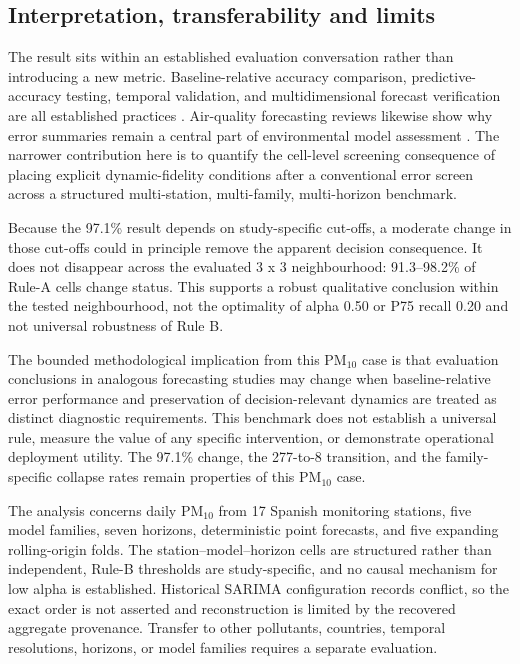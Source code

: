 \subsection{Interpretation, transferability and limits}

The result sits within an established evaluation conversation rather than
introducing a new metric. Baseline-relative accuracy comparison,
predictive-accuracy testing, temporal validation, and multidimensional
forecast verification are all established practices
\cite{hyndman2006,diebold1995,harvey1997,tashman2000,bergmeir2018,gneiting2011,jolliffe2012}.
Air-quality forecasting reviews likewise show why error summaries remain a
central part of environmental model assessment
\cite{mendez2023,tang2024,chadalavada2025}. The narrower contribution here
is to quantify the cell-level screening consequence of placing explicit
dynamic-fidelity conditions after a conventional error screen across a
structured multi-station, multi-family, multi-horizon benchmark.

Because the 97.1\% result depends on study-specific cut-offs, a
moderate change in those cut-offs could in principle remove the apparent
decision consequence. It does not disappear across the evaluated 3 x 3
neighbourhood: 91.3--98.2\% of Rule-A cells change status. This supports a
robust qualitative conclusion within the tested neighbourhood, not the
optimality of alpha 0.50 or P75 recall 0.20 and not universal robustness of
Rule B.

The bounded methodological implication from this PM$_{10}$ case is that
evaluation conclusions in analogous forecasting studies may change when
baseline-relative error performance and preservation of decision-relevant
dynamics are treated as distinct diagnostic requirements. This benchmark does
not establish a universal rule, measure the value of any specific
intervention, or demonstrate operational deployment utility. The 97.1\%
change, the 277-to-8 transition, and the family-specific collapse rates remain
properties of this PM$_{10}$ case.

The analysis concerns daily
PM$_{10}$ from 17 Spanish monitoring stations, five model families, seven
horizons, deterministic point forecasts, and five expanding rolling-origin
folds. The station--model--horizon cells are structured rather than
independent, Rule-B thresholds are study-specific, and no causal mechanism
for low alpha is established. Historical SARIMA configuration records
conflict, so the exact order is not asserted and reconstruction is limited
by the recovered aggregate provenance. Transfer to other pollutants,
countries, temporal resolutions, horizons, or model families requires a
separate evaluation.
